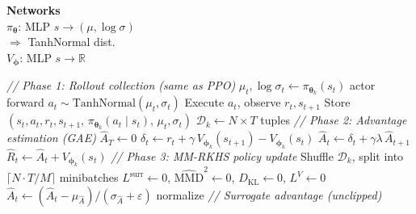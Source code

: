 \documentclass[11pt]{article}
\begin{document}
\begin{algorithm}[p]
\begin{minipage}[t]{0.28\linewidth}
\vspace{6pt}
\textbf{Networks} \\[2pt]
$\pi_{\boldsymbol{\theta}}$: MLP $s \to (\mu, \log\sigma)$ \\
\hspace*{1em}$\Rightarrow$ TanhNormal dist. \\
$V_{\boldsymbol{\phi}}$: MLP $s \to \mathbb{R}$
\end{minipage}%
\hfill
\vrule
\hfill
\begin{minipage}[t]{0.68\linewidth}
\begin{algorithmic}[1]
    \Statex \hspace{\algorithmicindent}\textit{// Phase 1: Rollout collection (same as PPO)}
            \State $\mu_t, \log\sigma_t \gets \pi_{\boldsymbol{\theta}_k}(s_t)$ \hfill actor forward
            \State $a_t \sim \text{TanhNormal}(\mu_t, \sigma_t)$
            \State Execute $a_t$, observe $r_t, s_{t+1}$
            \State Store $(s_t, a_t, r_t, s_{t+1},\, \pi_{\boldsymbol{\theta}_k}(a_t \mid s_t),\, \mu_t, \sigma_t)$
        \EndFor
    \EndFor
    \State $\mathcal{D}_k \gets N \!\times\! T$ tuples
    \Statex \hspace{\algorithmicindent}\textit{// Phase 2: Advantage estimation (GAE)}
        \State $\hat{A}_T \gets 0$
            \State $\delta_t \gets r_t + \gamma\, V_{\boldsymbol{\phi}_k}(s_{t+1}) - V_{\boldsymbol{\phi}_k}(s_t)$
            \State $\hat{A}_t \gets \delta_t + \gamma \lambda\, \hat{A}_{t+1}$
            \State $\hat{R}_t \gets \hat{A}_t + V_{\boldsymbol{\phi}_k}(s_t)$
        \EndFor
    \EndFor
    \Statex \hspace{\algorithmicindent}\textit{// Phase 3: MM-RKHS policy update}
    \State Shuffle $\mathcal{D}_k$, split into $\lceil N \!\cdot\! T / M \rceil$ minibatches
            \State $L^{\text{surr}} \gets 0$, \; $\widehat{\text{MMD}}^2 \gets 0$, \; $D_{\text{KL}} \gets 0$, \; $L^V \gets 0$
                \State $\hat{A}_t \gets (\hat{A}_t - \mu_{\hat{A}}) / (\sigma_{\hat{A}} + \varepsilon)$ \hfill normalize
                \Statex \hspace{\algorithmicindent}\hspace{\algorithmicindent}\hspace{\algorithmicindent}\hspace{\algorithmicindent}\textit{// Surrogate advantage (unclipped)}

\end{algorithmic}
\end{minipage}
\end{algorithm}
\end{document}
